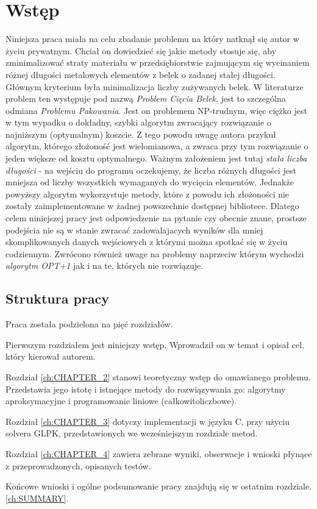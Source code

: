 \chapter{Wstęp}
\thispagestyle{chapterBeginStyle}

Niniejsza praca miała na celu zbadanie problemu na który natknął się autor w życiu prywatnym. Chciał on dowiedzieć się jakie metody stosuje się, aby zminimalizować straty materiału w przedsiębiorstwie zajmującym się wycinaniem różnej długości metalowych elementów z belek o zadanej stałej długości. Głównym kryterium była minimalizacja liczby zużywanych belek. W literaturze problem ten występuje pod nazwą \textit{Problem Cięcia Belek}, jest to szczególna odmiana \textit{Problemu Pakowania}. Jest on problemem NP-trudnym, więc ciężko jest w tym wypadku o dokładny, szybki algorytm zwracający rozwiązanie o najniższym (optymalnym) koszcie. Z tego powodu uwagę autora przykuł algorytm, którego złożoność jest wielomianowa, a zwraca przy tym rozwiązanie o jeden większe od kosztu optymalnego\cite{ALG_OPT_1}. Ważnym założeniem jest tutaj \textit{stała liczba długości} - na wejściu do programu oczekujemy, że liczba różnych długości jest mniejsza od liczby wszystkich wymaganych do wycięcia elementów. Jednakże powyższy algorytm wykorzystuje metody, które z powodu ich złożoności nie zostały zaimplementowane w żadnej powszechnie dostępnej bibliotece. 
Dlatego celem niniejszej pracy jest odpowiedzenie na pytanie czy obecnie znane, prostsze podejścia nie są w stanie zwracać zadowalajacych wyników dla mniej skomplikowanych danych wejściowych z którymi można spotkać się w życiu codziennym. Zwrócono również uwage na problemy naprzeciw którym wychodzi \textit{algorytm OPT+1} jak i na te, których nie rozwiązuje.


\section*{Struktura pracy}
Praca została podzielona na pięć rozdziałów. 

Pierwszym rozdziałem jest niniejszy wstęp. Wprowadził on w temat i opisał cel, który kierował autorem.

Rozdział \ref{ch:CHAPTER_2} stanowi teoretyczny wstęp do omawianego problemu. Przedstawia jego istotę i istnejące metody do rozwiązywania go: algorytmy aproksymacyjne i programowanie liniowe (całkowitoliczbowe).

Rozdział \ref{ch:CHAPTER_3} dotyczy implementacji w języku C, przy użyciu solvera GLPK, przedstawionych we wcześniejszym rozdziale metod.

Rozdział \ref{ch:CHAPTER_4} zawiera zebrane wyniki, obserwacje i wnioski płynące z przeprowadzonych, opisanych testów. 

Końcowe wnioski i ogólne podsumowanie pracy znajdują się w ostatnim rozdziale. \ref{ch:SUMMARY}.





